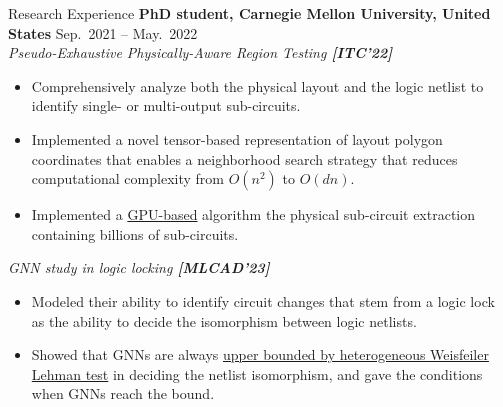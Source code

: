 \begin{rSection}{Research Experience}
{\bf PhD student, Carnegie Mellon University, United States}               \hfill { Sep.~2021 -- May.~2022} \\
\textit{Pseudo-Exhaustive Physically-Aware Region Testing \textbf{[{ITC'22}]}}
\begin{itemize}[noitemsep,topsep=-5pt]
    \item Comprehensively analyze both the physical layout and the logic netlist to identify single- or multi-output sub-circuits.
    \item Implemented a novel tensor-based representation of layout polygon coordinates that enables a neighborhood
    search strategy that reduces computational complexity
    from $O(n^2)$ to $O(dn)$.
    \item Implemented a \underline{GPU-based} algorithm the physical sub-circuit extraction containing billions of sub-circuits.
\end{itemize}
\textit{GNN study in logic locking \textbf{[{MLCAD'23}]}} 
\begin{itemize}[noitemsep,topsep=-5pt]
    \item Modeled their ability to identify circuit
    changes that stem from a logic lock as the ability to {decide
    the isomorphism between logic netlists.}
    \item Showed that GNNs
    are always \underline{upper bounded by heterogeneous Weisfeiler Lehman
    test} in deciding the netlist isomorphism, and gave the conditions
    when GNNs reach the bound. \\
\end{itemize}


\end{rSection}
